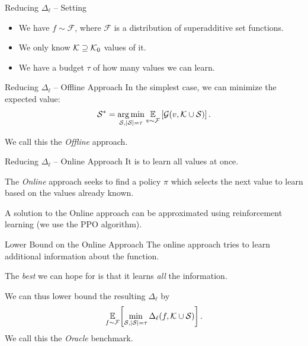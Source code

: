 \documentclass[aspectratio=169]{beamer}
\def\s{\mathcal{S}}
\begin{document}
\begin{frame}{Reducing $ \Delta_\ell $ -- Setting}
	\begin{itemize}[ ]
		\item<2-> We have \alert<2>{$ f \sim \mathcal{F} $}, where $ \mathcal{F} $ is a distribution of superadditive set functions.
		\item<3-> We only \alert<3>{know $ \mathcal{K} \supseteq \mathcal{K}_0 $} values of it.
		\item<4-> We have a \alert<4>{budget $ \tau $} of how many values we can learn.
	\end{itemize}
\end{frame}

\begin{frame}{Reducing $ \Delta_\ell $ -- Offline Approach}
	In the simplest case, we can \alert{minimize the expected value}: \[
		\s^* = \argmin_{\s, \absolute{\s} = \tau} \E_{v \sim \mathcal{F}} \left[ \mathcal{G}(v,\k \cup \s) \right].
	\]

	\vspace{2em}
	We call this the \emph{Offline} approach.
\end{frame}

\begin{frame}{Reducing $ \Delta_\ell $ -- Online Approach}
	It is  to learn all values at once.

	The \emph{Online} approach seeks to find a policy $ \pi $ which selects the next value to learn based on the values already known.

	A solution to the Online approach can be approximated using reinforcement learning (we use the PPO algorithm).
\end{frame}

\begin{frame}{Lower Bound on the Online Approach}
	The online approach tries to learn additional information about the function.

	The \emph{best} we can hope for is that it learns \emph{all} the information.

	We can thus lower bound the resulting $ \Delta_\ell $ by \[
		\fceb{\E_{f \sim \mathcal{F}}}{\min_{\s, \absolute{\s} = \tau} \Delta_\ell(f, \k \cup \s)}.
	\]
	We call this the \emph{Oracle} benchmark.
\end{frame}
\end{document}
